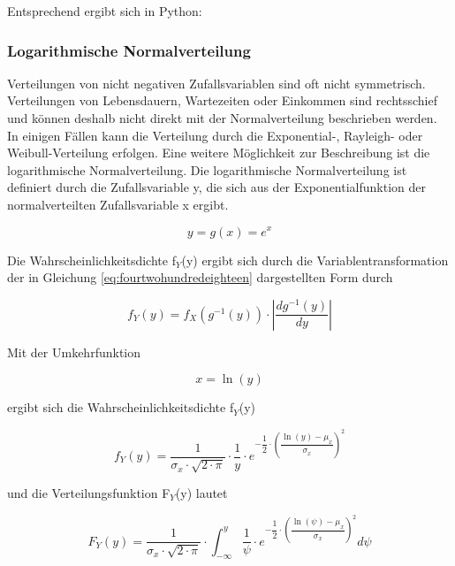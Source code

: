 \noindent Entsprechend ergibt sich in Python:



\subsubsection{Logarithmische Normalverteilung}

\noindent Verteilungen von nicht negativen Zufallsvariablen sind oft nicht symmetrisch. Verteilungen von Lebensdauern, Wartezeiten oder Einkommen sind rechtsschief und k\"{o}nnen deshalb nicht direkt mit der Normalverteilung beschrieben werden. In einigen F\"{a}llen kann die Verteilung durch die Exponential-, Rayleigh- oder Weibull-Verteilung erfolgen. Eine weitere M\"{o}glichkeit zur Beschreibung ist die logarithmische Normalverteilung. Die logarithmische Normalverteilung ist definiert durch die Zufallsvariable y, die sich aus der Exponentialfunktion der normalverteilten Zufallsvariable x ergibt.

\begin{equation}\label{eq:fourtwohundredeighteen}
y=g(x)=e^{x}
\end{equation}

\noindent Die Wahrscheinlichkeitsdichte f${}_{Y}$(y) ergibt sich durch die Variablentransformation der in Gleichung \eqref{eq:fourtwohundredeighteen} dargestellten Form durch

\begin{equation}\label{eq:fourtwohundrednineteen}
f_{Y} (y)=f_{X} \left(g^{-1} (y)\right)\cdot \left|\dfrac{dg^{-1} (y)}{dy} \right|
\end{equation}

\noindent Mit der Umkehrfunktion 

\begin{equation}\label{eq:fourtwohundredtwenty}
x=\ln (y)
\end{equation}

\noindent ergibt sich die Wahrscheinlichkeitsdichte f${}_{Y}$(y) 

\begin{equation}\label{eq:fourtwohundredtwentyone}
f_{Y} (y)=\dfrac{1}{\sigma _{x} \cdot \sqrt{2\cdot \pi } } \cdot \dfrac{1}{y} \cdot e^{-\dfrac{1}{2} \cdot \left(\dfrac{\ln (y)-\mu _{x} }{\sigma _{x} } \right)^{2} }
\end{equation}

\noindent und die Verteilungsfunktion F$_{Y}$(y) lautet

\begin{equation}\label{eq:fourtwohundredtwentytwo}
F_{Y} (y)=\dfrac{1}{\sigma _{x} \cdot \sqrt{2\cdot \pi } } \cdot \int _{-\infty }^{y}\dfrac{1}{\psi } \cdot e^{-\dfrac{1}{2} \cdot \left(\dfrac{\ln (\psi )-\mu _{x} }{\sigma _{x} } \right)^{2} }  d\psi
\end{equation}

